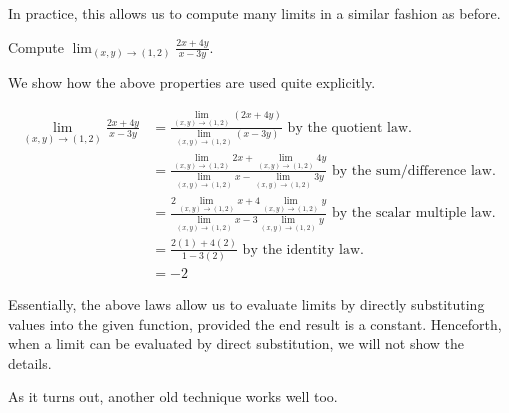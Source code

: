 \documentclass{ximera}
\newcommand{\point}[1]{\left(#1\right)} %
\newcommand{\Lim}[2]{\lim_{#1 \to #2}}
\begin{document}
In practice, this allows us to compute many limits in a similar fashion as before.

\begin{example}
Compute $\Lim{\point{x,y}}{\point{1,2}} \frac{2x+4y}{x-3y}$.  

\begin{explanation}
We show how the above properties are used quite explicitly.

\begin{align*}
\Lim{\point{x,y}}{\point{1,2}} \frac{2x+4y}{x-3y} & = \frac{\Lim{\point{x,y}}{\point{1,2}}(2x+4y)}{\Lim{\point{x,y}}{\point{1,2}}(x-3y)} \textrm{ by the quotient law. } \\
&=  \frac{\Lim{\point{x,y}}{\point{1,2}}2x+\Lim{\point{x,y}}{\point{1,2}} 4y}{\Lim{\point{x,y}}{\point{1,2}}x-\Lim{\point{x,y}}{\point{1,2}}3y}  \textrm{ by the sum/difference law. } \\
&=  \frac{2\Lim{\point{x,y}}{\point{1,2}}x+4\Lim{\point{x,y}}{\point{1,2}} y}{\Lim{\point{x,y}}{\point{1,2}}x-3\Lim{\point{x,y}}{\point{1,2}}y}  \textrm{ by the scalar multiple law. } \\
&= \frac{2(1)+4(2)}{1-3(2)} \textrm{ by the identity law. } \\
&= -2
\end{align*}
\end{explanation}
\end{example}

Essentially, the above laws allow us to evaluate limits by directly substituting values into the given function, provided the end result is a constant.  Henceforth, when a limit can be evaluated by direct substitution, we will not show the details.  

As it turns out, another old technique works well too.
\end{document}
